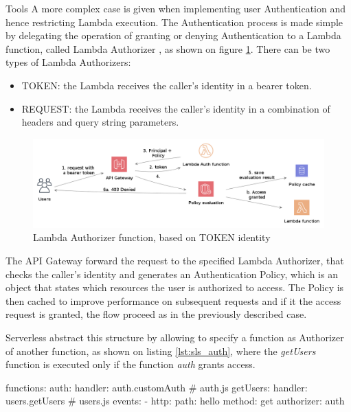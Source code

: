 \begin{chapter}{Tools}
    A more complex case is given when implementing user Authentication and hence
    restricting Lambda execution. The Authentication process is made simple by
    delegating the operation of granting or denying Authentication to a Lambda
    function, called Lambda Authorizer \cite{aws_api_gateway_doc}, as shown on
    figure \ref{fig:lambda_with_auth}. There can be two types of Lambda Authorizers:
    \begin{itemize}
        \item TOKEN: the Lambda receives the caller's identity in a bearer token.
        \item REQUEST: the Lambda receives the caller's identity in a combination
            of headers and query string parameters.
    \end{itemize}

    \begin{figure}
        \centering
        \includegraphics[width=\linewidth]{source/diagrams/lambda_authorizer.png}
        \caption{Lambda Authorizer function, based on TOKEN identity}
        \label{fig:lambda_with_auth}
    \end{figure}

    The API Gateway forward the request to the specified Lambda Authorizer, that
    checks the caller's identity and generates an Authentication Policy, which is
    an object that states which resources the user is authorized to access.
    The Policy is then cached to improve performance on subsequent requests and
    if it the access request is granted, the flow proceed as in the previously
    described case.

    Serverless abstract this structure by allowing to specify a function as
    Authorizer of another function, as shown on listing \ref{lst:sls_auth}, where
    the \textit{getUsers} function is executed only if the function \textit{auth}
    grants access.

    \bigskip
    \begin{code}[caption=Authorizer definition on Serverless, label={lst:sls_auth},
        language=yaml]
functions:
  auth:
    handler: auth.customAuth  # auth.js
  getUsers:
    handler: users.getUsers   # users.js
    events:
      - http:
        path: hello
        method: get
        authorizer: auth
    \end{code}


\end{chapter}
